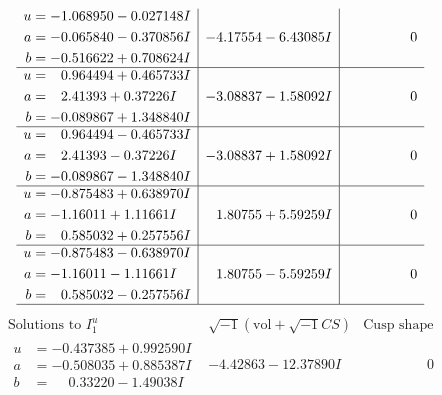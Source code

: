 \documentclass[1p]{elsarticle_modified}
\theoremstyle{definition}
\newcommand{\I}{\sqrt{-1}}
\begin{document}
$$\begin{array}{c|c|c}
\begin{aligned}
u &= -1.068950 - 0.027148 I \\
a &= -0.065840 - 0.370856 I \\
b &= -0.516622 + 0.708624 I\end{aligned}
 & -4.17554 - 6.43085 I & \phantom{-0.000000 } 0 \\ \hline\begin{aligned}
u &= \phantom{-}0.964494 + 0.465733 I \\
a &= \phantom{-}2.41393 + 0.37226 I \\
b &= -0.089867 + 1.348840 I\end{aligned}
 & -3.08837 - 1.58092 I & \phantom{-0.000000 } 0 \\ \hline\begin{aligned}
u &= \phantom{-}0.964494 - 0.465733 I \\
a &= \phantom{-}2.41393 - 0.37226 I \\
b &= -0.089867 - 1.348840 I\end{aligned}
 & -3.08837 + 1.58092 I & \phantom{-0.000000 } 0 \\ \hline\begin{aligned}
u &= -0.875483 + 0.638970 I \\
a &= -1.16011 + 1.11661 I \\
b &= \phantom{-}0.585032 + 0.257556 I\end{aligned}
 & \phantom{-}1.80755 + 5.59259 I & \phantom{-0.000000 } 0 \\ \hline\begin{aligned}
u &= -0.875483 - 0.638970 I \\
a &= -1.16011 - 1.11661 I \\
b &= \phantom{-}0.585032 - 0.257556 I\end{aligned}
 & \phantom{-}1.80755 - 5.59259 I & \phantom{-0.000000 } 0\\
 \hline 
 \end{array}$$\newpage$$\begin{array}{c|c|c}  
\text{Solutions to }I^u_{1}& \I (\text{vol} + \sqrt{-1}CS) & \text{Cusp shape}\\
 \hline 
\begin{aligned}
u &= -0.437385 + 0.992590 I \\
a &= -0.508035 + 0.885387 I \\
b &= \phantom{-}0.33220 - 1.49038 I\end{aligned}
 & -4.42863 - 12.37890 I & \phantom{-0.000000 } 0 \\ \hline\begin{aligned}

\end{aligned}
\end{array}$$
\end{document}
